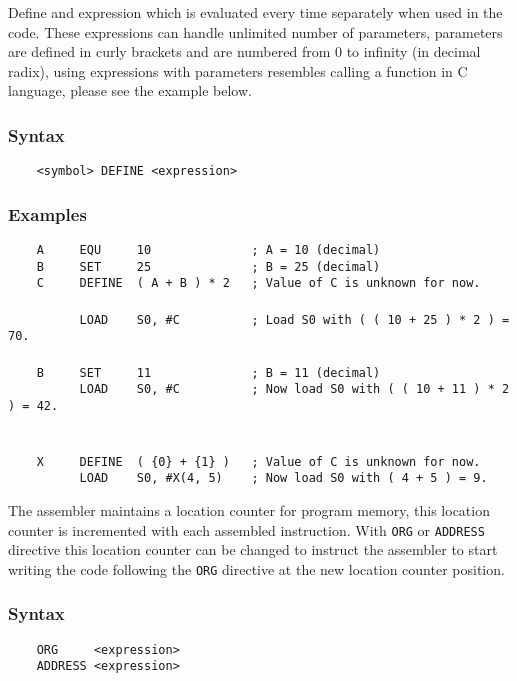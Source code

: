     \clearpage
        Define and expression which is evaluated every time separately when used in the code. These expressions can handle unlimited number of parameters, parameters are defined in curly brackets and are numbered from 0 to infinity (in decimal radix), using expressions with parameters resembles calling a function in C language, please see the example below.

        \subsubsection{Syntax}
            \verb'    <symbol> DEFINE <expression>'

        \subsubsection{Examples}
            \verb'    A     EQU     10              ; A = 10 (decimal)'\\
            \verb'    B     SET     25              ; B = 25 (decimal)'\\
            \verb'    C     DEFINE  ( A + B ) * 2   ; Value of C is unknown for now.'\\
            \verb''\\
            \verb'          LOAD    S0, #C          ; Load S0 with ( ( 10 + 25 ) * 2 ) = 70.'\\
            \verb''\\
            \verb'    B     SET     11              ; B = 11 (decimal)'\\
            \verb'          LOAD    S0, #C          ; Now load S0 with ( ( 10 + 11 ) * 2 ) = 42.'\\
            \verb''\\
            \verb''\\
            \verb'    X     DEFINE  ( {0} + {1} )   ; Value of C is unknown for now.'\\
            \verb'          LOAD    S0, #X(4, 5)    ; Now load S0 with ( 4 + 5 ) = 9.'

        The assembler maintains a location counter for program memory, this location counter is incremented with each assembled instruction. With \texttt{ORG} or \texttt{ADDRESS} directive this location counter can be changed to instruct the assembler to start writing the code following the \texttt{ORG} directive at the new location counter position.

        \subsubsection{Syntax}
            \verb'    ORG     <expression>'\\
            \verb'    ADDRESS <expression>'


